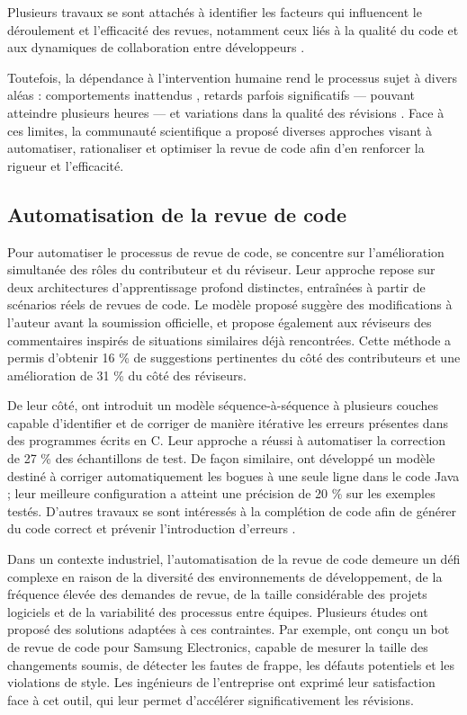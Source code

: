 Plusieurs travaux se sont attachés à identifier les facteurs qui influencent le déroulement et l’efficacité des revues, notamment ceux liés à la qualité du code et aux dynamiques de collaboration entre développeurs \parencite{kononenko2016code, dougan2022towards}.

Toutefois, la dépendance à l’intervention humaine rend le processus sujet à divers aléas : comportements inattendus \parencite{fuggetta2000software}, retards parfois significatifs — pouvant atteindre plusieurs heures \parencite{bosu2013impact} — et variations dans la qualité des révisions \parencite{dougan2022towards}.
Face à ces limites, la communauté scientifique a proposé diverses approches visant à automatiser, rationaliser et optimiser la revue de code afin d’en renforcer la rigueur et l’efficacité.

\subsection{Automatisation de la revue de code}
Pour automatiser le processus de revue de code, \textcite{tufano2021towards} se concentre sur l’amélioration simultanée des rôles du contributeur et du réviseur. Leur approche repose sur deux architectures d’apprentissage profond distinctes, entraînées à partir de scénarios réels de revues de code. Le modèle proposé suggère des modifications à l’auteur avant la soumission officielle, et propose également aux réviseurs des commentaires inspirés de situations similaires déjà rencontrées. Cette méthode a permis d’obtenir 16 \% de suggestions pertinentes du côté des contributeurs et une amélioration de 31 \% du côté des réviseurs.

De leur côté, \textcite{gupta2017deepfix} ont introduit un modèle séquence-à-séquence à plusieurs couches capable d’identifier et de corriger de manière itérative les erreurs présentes dans des programmes écrits en C. Leur approche a réussi à automatiser la correction de 27 \% des échantillons de test. De façon similaire, \textcite{chen2019sequencer} ont développé un modèle destiné à corriger automatiquement les bogues à une seule ligne dans le code Java ; leur meilleure configuration a atteint une précision de 20 \% sur les exemples testés. D’autres travaux se sont intéressés à la complétion de code afin de générer du code correct et prévenir l’introduction d’erreurs \cite{sadovykh2021veridevops, alon2020structural}.

Dans un contexte industriel, l'automatisation de la revue de code demeure un défi complexe en raison de la diversité des environnements de développement, de la fréquence élevée des demandes de revue, de la taille considérable des projets logiciels et de la variabilité des processus entre équipes. Plusieurs études ont proposé des solutions adaptées à ces contraintes. Par exemple, \textcite{kim2022understanding} ont conçu un bot de revue de code pour Samsung Electronics, capable de mesurer la taille des changements soumis, de détecter les fautes de frappe, les défauts potentiels et les violations de style. Les ingénieurs de l’entreprise ont exprimé leur satisfaction face à cet outil, qui leur permet d’accélérer significativement les révisions.

